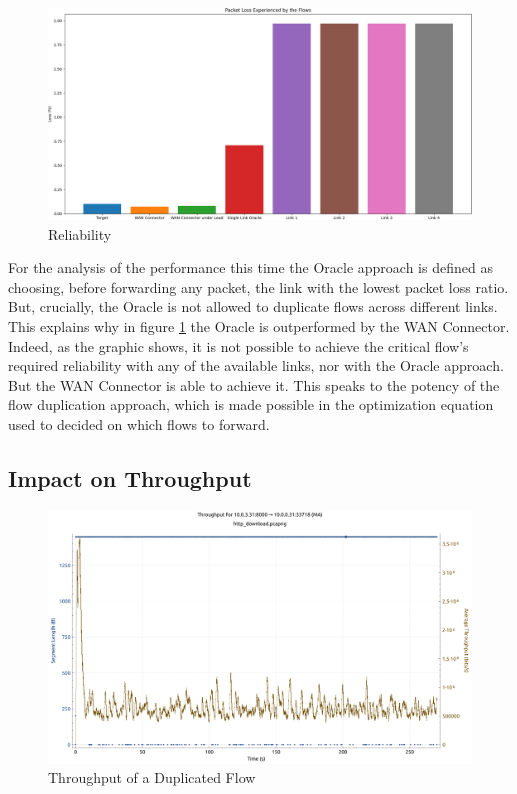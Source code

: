 \begin{figure}[h]
    \centering
        \includegraphics[height=0.66\textwidth,width=\textwidth]{fig/loss_bars1.png}
        \caption{Reliability}
        \label{fig:loss_bars1}
\end{figure}

For the analysis of the performance this time the Oracle approach is defined as choosing, before forwarding any packet, the link with the lowest packet loss ratio. But, crucially, the Oracle is not allowed to duplicate flows across different links. This explains why in figure \ref{fig:loss_bars1} the Oracle is outperformed by the WAN Connector. Indeed, as the graphic shows, it is not possible to achieve the critical flow's required reliability with any of the available links, nor with the Oracle approach. But the WAN Connector is able to achieve it. This speaks to the potency of the flow duplication approach, which is made possible in the optimization equation used to decided on which flows to forward.

\subsection{Impact on Throughput}


\begin{figure}[h]
    \centering
        \includegraphics[height=0.66\textwidth,width=\textwidth]{fig/tcp_throughput.pdf}
        \caption{Throughput of a Duplicated Flow}
        \label{fig:dup_tcp}
\end{figure}

